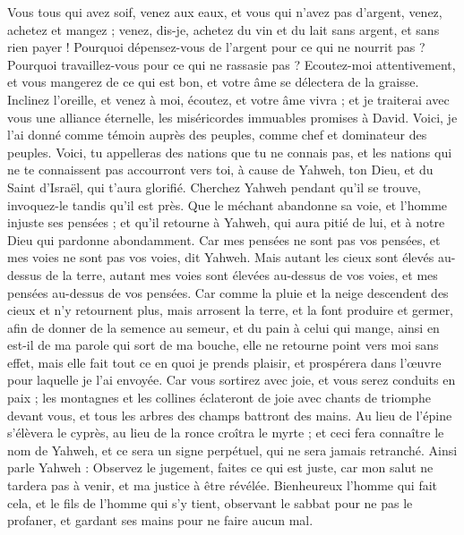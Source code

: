 \begin{multicols}{2}
\VerseOne{}Vous tous qui avez soif, venez aux eaux, et vous qui n'avez pas d'argent, venez, achetez et mangez ; venez, dis-je, achetez du vin et du lait sans argent, et sans rien payer !
Pourquoi dépensez-vous de l'argent pour ce qui ne nourrit pas ? Pourquoi travaillez-vous pour ce qui ne rassasie pas ? Ecoutez-moi attentivement, et vous mangerez de ce qui est bon, et votre âme se délectera de la graisse.
Inclinez l'oreille, et venez à moi, écoutez, et votre âme vivra ; et je traiterai avec vous une alliance éternelle, les miséricordes immuables promises à David.
Voici, je l'ai donné comme témoin auprès des peuples, comme chef et dominateur des peuples.
Voici, tu appelleras des nations que tu ne connais pas, et les nations qui ne te connaissent pas accourront vers toi, à cause de Yahweh, ton Dieu, et du Saint d'Israël, qui t'aura glorifié.
Cherchez Yahweh pendant qu'il se trouve, invoquez-le tandis qu'il est près.
Que le méchant abandonne sa voie, et l'homme injuste ses pensées ; et qu'il retourne à Yahweh, qui aura pitié de lui, et à notre Dieu qui pardonne abondamment.
Car mes pensées ne sont pas vos pensées, et mes voies ne sont pas vos voies, dit Yahweh.
Mais autant les cieux sont élevés au-dessus de la terre, autant mes voies sont élevées au-dessus de vos voies, et mes pensées au-dessus de vos pensées.
Car comme la pluie et la neige descendent des cieux et n'y retournent plus, mais arrosent la terre, et la font produire et germer, afin de donner de la semence au semeur, et du pain à celui qui mange,
ainsi en est-il de ma parole qui sort de ma bouche, elle ne retourne point vers moi sans effet, mais elle fait tout ce en quoi je prends plaisir, et prospérera dans l'œuvre pour laquelle je l'ai envoyée.
Car vous sortirez avec joie, et vous serez conduits en paix ; les montagnes et les collines éclateront de joie avec chants de triomphe devant vous, et tous les arbres des champs battront des mains.
Au lieu de l'épine s'élèvera le cyprès, au lieu de la ronce croîtra le myrte ; et ceci fera connaître le nom de Yahweh, et ce sera un signe perpétuel, qui ne sera jamais retranché.
\VerseOne{}Ainsi parle Yahweh : Observez le jugement, faites ce qui est juste, car mon salut ne tardera pas à venir, et ma justice à être révélée.
Bienheureux l'homme qui fait cela, et le fils de l'homme qui s'y tient, observant le sabbat pour ne pas le profaner, et gardant ses mains pour ne faire aucun mal.

\end{multicols}
